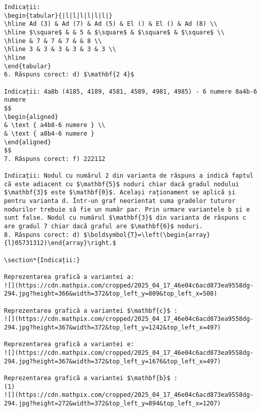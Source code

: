 \begin{verbatim}
Indicații:
\begin{tabular}{|l|l|l|l|l|l|}
\hline Ad (3) & Ad (7) & Ad (5) & El () & El () & Ad (8) \\
\hline $\square$ & & 5 & $\square$ & $\square$ & $\square$ \\
\hline & 7 & 7 & 7 & & 8 \\
\hline 3 & 3 & 3 & 3 & 3 & 3 \\
\hline
\end{tabular}
6. Răspuns corect: d) $\mathbf{2 4}$

Indicații: 4a8b (4185, 4189, 4581, 4589, 4981, 4985) - 6 numere 8a4b-6 numere
$$
\begin{aligned}
& \text { a4b8-6 numere } \\
& \text { a8b4-6 numere }
\end{aligned}
$$
7. Răspuns corect: f) 222112

Indicații: Nodul cu numărul 2 din varianta de răspuns a indică faptul că este adiacent cu $\mathbf{5}$ noduri chiar dacă gradul nodului $\mathbf{3}$ este $\mathbf{0}$. Același raționament se aplică și pentru varianta d. Într-un graf neorientat suma gradelor tuturor nodurilor trebuie să fie un număr par. Prin urmare variantele b și e sunt false. Nodul cu numărul $\mathbf{3}$ din varianta de răspuns c are gradul 7 chiar dacă graful are $\mathbf{6}$ noduri.
8. Răspuns corect: d) $\boldsymbol{T}=\left(\begin{array}{l}05731312)\end{array}\right.$

\section*{Indicații:}

Reprezentarea grafică a variantei a:
![](https://cdn.mathpix.com/cropped/2025_04_17_46e04c6acd873ea9558dg-294.jpg?height=366&width=372&top_left_y=809&top_left_x=508)

Reprezentarea grafică a variantei $\mathbf{c}$ :
![](https://cdn.mathpix.com/cropped/2025_04_17_46e04c6acd873ea9558dg-294.jpg?height=367&width=372&top_left_y=1242&top_left_x=497)

Reprezentarea grafică a variantei e:
![](https://cdn.mathpix.com/cropped/2025_04_17_46e04c6acd873ea9558dg-294.jpg?height=367&width=372&top_left_y=1676&top_left_x=497)

Reprezentarea grafică a variantei $\mathbf{b}$ :
(1)
![](https://cdn.mathpix.com/cropped/2025_04_17_46e04c6acd873ea9558dg-294.jpg?height=272&width=372&top_left_y=894&top_left_x=1207)


\end{verbatim}

